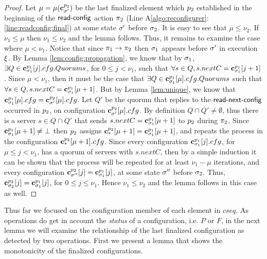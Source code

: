 \begin{proof}
	Let $\mu = \mu(\mathbf{c}^{p_2}_{\sigma'})$ %
	be the last finalized element which $p_2$ established in the beginning of 
	the $\act{read-config}$ action $\pi_2$ (Line A\ref{algo:reconfigurer}:\ref{line:readconfig:final}) at some state $\sigma'$ before $\sigma_2$. 
	It is easy to see that $\mu\leq \nu_2$. If $\nu_1 \leq \mu$ then $\nu_1\leq \nu_2$ and 
	the lemma follows. Thus, it remains
	to examine the case where $\mu < \nu_1$. Notice that since $\pi_1\rightarrow\pi_2$ then $\sigma_1$ appears before 
	$\sigma'$ in execution $\EX$. By Lemma \ref{lem:config:propagation}, we know that by $\sigma_1$, 
	$\exists Q\in\mathbf{c}^{p_1}_{\sigma_1}[j].cfg.Quorums$, for $0\leq j < \nu_1$,   such that 
	$\forall s\in Q, s.nextC = \mathbf{c}^{p_1}_{\sigma_1}[j+1]$. Since $\mu < \nu_1$, then it must be the case 
	that $\exists Q\in \mathbf{c}^{p_1}_{\sigma_1}[\mu].cfg.Quorums$ such that $\forall s\in Q, s.nextC = \mathbf{c}^{p_1}_{\sigma_1}[\mu+1]$.
	But by Lemma \ref{lem:unique}, we know that $\mathbf{c}^{p_1}_{\sigma_1}[\mu].cfg= \mathbf{c}^{p_2}_{\sigma'}[\mu].cfg$. 
	Let $Q'$ be the quorum that replies to the $\act{read-next-config}$ occurred in $p_2$, on configuration  $\mathbf{c}^{p_2}_{\sigma'}[\mu].cfg$.
	By definition $Q\cap Q'\neq \emptyset$, thus there is a server $s\in Q\cap Q'$ that sends $s.nextC = \mathbf{c}^{p_1}_{\sigma_1}[\mu+1]$
	to $p_2$ during $\pi_2$. Since $\mathbf{c}^{p_1}_{\sigma_1}[\mu+1]\neq\bot$ then $p_2$ assigns $\mathbf{c}^{p_2}_{*}[\mu+1]=\mathbf{c}^{p_1}_{\sigma_1}[\mu+1]$, and 
	repeats the process in the configuration $\mathbf{c}^{p_2}_{*}[\mu+1].cfg$. Since every configuration $\mathbf{c}^{p_1}_{\sigma_1}[j].cfg$, 
		for $\mu\leq j<\nu_1$, has a quorum of servers with $s.nextC$, then by a simple induction it can be shown that the process will 
		be repeated for at least $\nu_1-\mu$ iterations, and  every configuration
		$\mathbf{c}^{p_2}_{\sigma''}[j]=\mathbf{c}^{p_1}_{\sigma_1}[j]$, at some state $\sigma''$ before $\sigma_2$. 
		Thus, $\mathbf{c}^{p_2}_{\sigma_2}[j]=\mathbf{c}^{p_1}_{\sigma_1}[j]$, for $0\leq j\leq \nu_1$. Hence $\nu_1\leq\nu_2$ and the lemma follows in this case as well. 
\end{proof}

Thus far we focused on the configuration member of each element in $cseq$. As operations do get in account
the \emph{status} of a configuration, i.e. $P$ or $F$, in the next lemma we will examine the relationship of 
the last finalized configuration as detected by two operations. First we present a lemma that shows the 
monotonicity of the finalized configurations.

